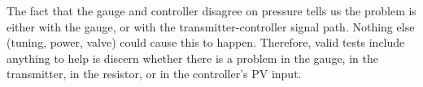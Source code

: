 The fact that the gauge and controller disagree on pressure tells us the problem is either with the gauge, or with the transmitter-controller signal path.  Nothing else (tuning, power, valve) could cause this to happen.  Therefore, valid tests include anything to help is discern whether there is a problem in the gauge, in the transmitter, in the resistor, or in the controller's PV input.




